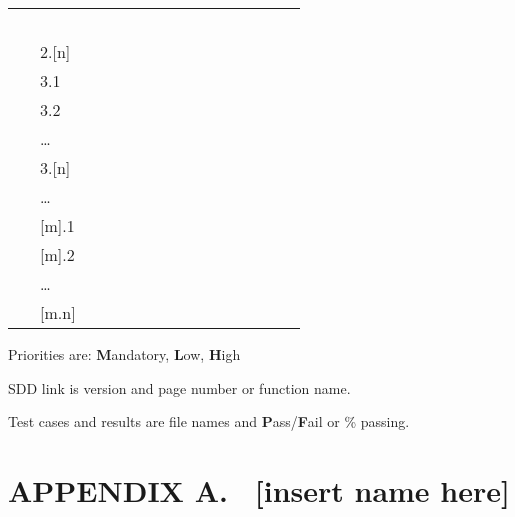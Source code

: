 \documentclass[twoside,letterpaper]{article}
\begin{document}
\begin{flushleft}
\begin{supertabular}{m{0.9212598in}|m{0.42125985in}|m{1.9212599in}|m{0.39275986in}|m{0.7587598in}|m{0.6622598in}|m{0.5462598in}|m{0.6712598in}|m{0.6087598in}|m{0.6712598in}|m{0.6295598in}|}
~
 &
~
 &
~
 &
~
 &
~
 &
~
 &
~
 &
~
 &
~
\\\hhline{~----------}
 &
\centering {}\color{black} 2.[n] &
~
 &
~
 &
~
 &
~
 &
~
 &
~
 &
~
 &
~
 &
~
\\\hhline{~----------}
 &
\centering {}\color{black} 3.1 &
~
 &
~
 &
~
 &
~
 &
~
 &
~
 &
~
 &
~
 &
~
\\\hline
 &
\centering {}\color{black} 3.2 &
~
 &
~
 &
~
 &
~
 &
~
 &
~
 &
~
 &
~
 &
~
\\\hhline{~----------}
 &
\centering {}\color{black} {\dots} &
~
 &
~
 &
~
 &
~
 &
~
 &
~
 &
~
 &
~
 &
~
\\\hhline{~----------}
 &
\centering {}\color{black} 3.[n] &
~
 &
~
 &
~
 &
~
 &
~
 &
~
 &
~
 &
~
 &
~
\\\hhline{~----------}
 &
\centering {}\color{black} {\dots} &
~
 &
~
 &
~
 &
~
 &
~
 &
~
 &
~
 &
~
 &
~
\\\hline
{} &
\centering {}\color{black} [m].1 &
~
 &
~
 &
~
 &
~
 &
~
 &
~
 &
~
 &
~
 &
~
\\\hline
 &
\centering {}\color{black} [m].2 &
~
 &
~
 &
~
 &
~
 &
~
 &
~
 &
~
 &
~
 &
~
\\\hhline{~----------}
 &
\centering {}\color{black} {\dots} &
~
 &
~
 &
~
 &
~
 &
~
 &
~
 &
~
 &
~
 &
~
\\\hline
{} &
\centering {}\color{black} [m.n] &
~
 &
~
 &
~
 &
~
 &
~
 &
~
 &
~
 &
~
 &
~
\\\hline
\end{supertabular}
\end{flushleft}
{\color{black}
Priorities are: \textbf{M}andatory, \textbf{L}ow, \textbf{H}igh}

{\color{black}
SDD link is version and page number or function name.}

{\color{black}
Test cases and results are file names and \textbf{P}ass/\textbf{F}ail or
\% passing.}

\clearpage\setcounter{page}{1}\pagestyle{Convertvii}
\section[APPENDIX A. \ [insert name
here{]}]{\rmfamily\bfseries\color{black}
APPENDIX A. \ [insert name here]}
\end{document}
